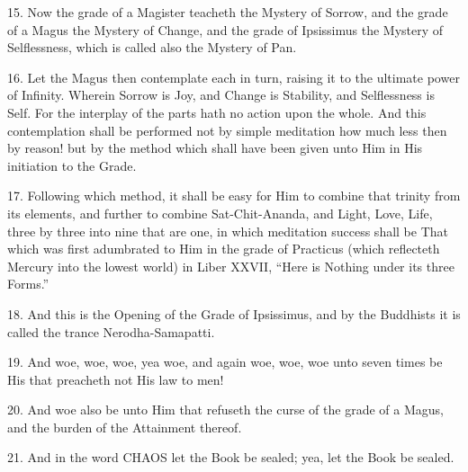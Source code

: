 15. Now the grade of a Magister teacheth the Mystery of Sorrow, and the grade of a Magus the Mystery of Change, and the grade of Ipsissimus the Mystery of Selflessness, which is called also the Mystery of Pan.

16. Let the Magus then contemplate each in turn, raising it to the ultimate power of Infinity. Wherein Sorrow is Joy, and Change is Stability, and Selflessness is Self. For the interplay of the parts hath no action upon the whole. And this contemplation shall be performed not by simple meditation \textemdash{} how much less then by reason! but by the method which shall have been given unto Him in His initiation to the Grade.

17. Following which method, it shall be easy for Him to combine that trinity from its elements, and further to combine Sat-Chit-Ananda, and Light, Love, Life, three by three into nine that are one, in which meditation success shall be That which was first adumbrated to Him in the grade of Practicus (which reflecteth Mercury into the lowest world) in Liber XXVII, \enquote{Here is Nothing under its three Forms.}

18. And this is the Opening of the Grade of Ipsissimus, and by the Buddhists it is called the trance Nerodha-Samapatti.

19. And woe, woe, woe, yea woe, and again woe, woe, woe unto seven times be His that preacheth not His law to men!

20. And woe also be unto Him that refuseth the curse of the grade of a Magus, and the burden of the Attainment thereof.

21. And in the word CHAOS let the Book be sealed; yea, let the Book be sealed.
